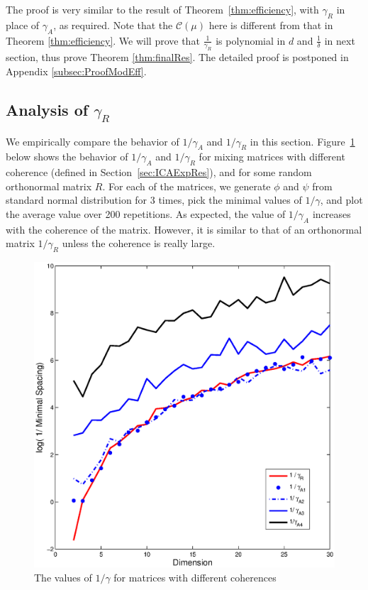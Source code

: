 \documentclass[11pt]{article}
\begin{document}
The proof is very similar to the result of Theorem~\ref{thm:efficiency}, with $\gamma_R$ in place of $\gamma_A$, as required.
Note that the $\mathcal{C}(\mu)$ here is different from that in Theorem \ref{thm:efficiency}. We will prove that $\frac{1}{\gamma_R}$ is polynomial in 
$d$ and $\frac{1}{\delta}$ in next section, thus prove Theorem \ref{thm:finalRes}. The detailed proof is postponed in Appendix \ref{subsec:ProofModEff}.

\subsection{Analysis of $\gamma_R$}
\label{subsec:ICAgamma}
We empirically compare the behavior of $1/\gamma_A$ and $1/\gamma_R$ in this section.
Figure~\ref{fig:miniSpacing} below shows the behavior of $1/\gamma_A$ and $1/\gamma_R$ for mixing matrices with different coherence (defined in Section~\ref{sec:ICAExpRes}), and for some random orthonormal matrix $R$. For each of the matrices, we generate $\phi$ and $\psi$ from standard normal distribution for 3 times, pick the minimal values of $1/\gamma$, and plot the average value over 200 repetitions. 
As expected, the value of $1/\gamma_A$ increases with the coherence of the matrix. However, it is similar to that of an orthonormal matrix $1/\gamma_R$ unless the coherence is really large. 
\begin{figure}[h]
	\centering
	\includegraphics[width = 0.75\columnwidth]{images/miniSpacing}
	\caption[The values of $1/\gamma$]{
		\label{fig:miniSpacing}
		The values of $1/\gamma$ for matrices with different coherences}
\end{figure}
\end{document}
